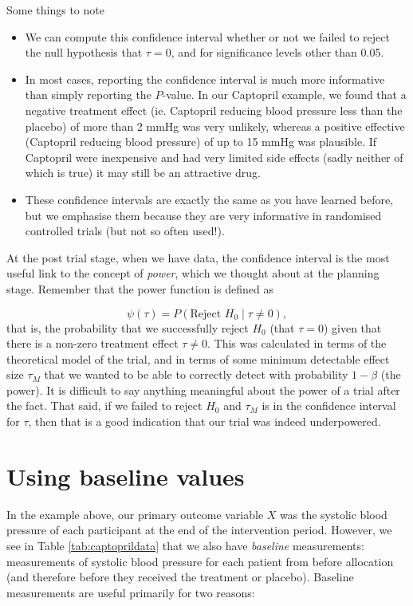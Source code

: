 \documentclass[
  openany]{book}
\providecommand{\tightlist}{%
  \setlength{\itemsep}{0pt}\setlength{\parskip}{0pt}}
\theoremstyle{definition}
\theoremstyle{definition}
\theoremstyle{definition}
\theoremstyle{definition}
\theoremstyle{remark}
\begin{document}
Some things to note

\begin{itemize}
\tightlist
\item
  We can compute this confidence interval whether or not we failed to reject the null hypothesis that \(\tau=0\), and for significance levels other than 0.05.
\item
  In most cases, reporting the confidence interval is much more informative than simply reporting the \(P\)-value. In our Captopril example, we found that a negative treatment effect (ie. Captopril reducing blood pressure less than the placebo) of more than 2 mmHg was very unlikely, whereas a positive effective (Captopril reducing blood pressure) of up to 15 mmHg was plausible. If Captopril were inexpensive and had very limited side effects (sadly neither of which is true) it may still be an attractive drug.
\item
  These confidence intervals are exactly the same as you have learned before, but we emphasise them because they are very informative in randomised controlled trials (but not so often used!).
\end{itemize}

At the post trial stage, when we have data, the confidence interval is the most useful link to the concept of \emph{power}, which we thought about at the planning stage. Remember that the power function is defined as

\[\psi \left(\tau\right) = P\left(\text{Reject }H_0\mid \tau\neq 0\right),\] that is, the probability that we successfully reject \(H_0\) (that \(\tau=0\)) given that there is a non-zero treatment effect \(\tau\neq 0\). This was calculated in terms of the theoretical model of the trial, and in terms of some minimum detectable effect size \(\tau_M\) that we wanted to be able to correctly detect with probability \(1-\beta\) (the power). It is difficult to say anything meaningful about the power of a trial after the fact. That said, if we failed to reject \(H_0\) and \(\tau_M\) is in the confidence interval for \(\tau\), then that is a good indication that our trial was indeed underpowered.

\section{Using baseline values}\label{baseline}

In the example above, our primary outcome variable \(X\) was the systolic blood pressure of each participant at the end of the intervention period. However, we see in Table \ref{tab:captoprildata} that we also have \emph{baseline} measurements: measurements of systolic blood pressure for each patient from before allocation (and therefore before they received the treatment or placebo). Baseline measurements are useful primarily for two reasons:
\end{document}
